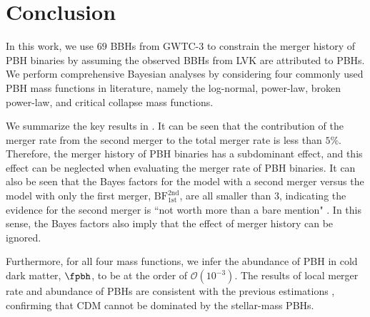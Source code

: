 \documentclass[
reprint,           %
superscriptaddress,%
amsmath,           %
amssymb,           %
aps,               %
prd,               %
notitlepage,       %
longbibliography,  %
floatfix,          %
nofootinbib,
]{revtex4-1}
\begin{document}
\section{\label{conclusion}Conclusion}

In this work, we use $69$ BBHs from GWTC-3 to constrain the merger history of PBH binaries by assuming the observed BBHs from LVK are attributed to PBHs. We perform comprehensive Bayesian analyses by considering four commonly used PBH mass functions in literature, namely the log-normal, power-law, broken power-law, and critical collapse mass functions. 

We summarize the key results in . 
It can be seen that the contribution of the merger rate from the second merger to the total merger rate is less than $5\%$.
Therefore, the merger history of PBH binaries has a subdominant effect, and this effect can be neglected when evaluating the merger rate of PBH binaries.
It can also be seen that the Bayes factors for the model with a second merger versus the model with only the first merger, $\mathrm{BF}^{\mathrm{2nd}}_{\mathrm{1st}}$, are all smaller than $3$, indicating the evidence for the second merger is ``not worth more than a bare mention" \cite{BF}. In this sense, the Bayes factors also imply that the effect of merger history can be ignored.

Furthermore, for all four mass functions, we infer the abundance of PBH in cold dark matter, $\fpbh$, to be at the order of $\mathcal{O}(10^{-3})$. The results of local merger rate and abundance of PBHs are consistent with the previous estimations \cite{Sasaki:2016jop,Ali-Haimoud:2017rtz,Chen:2018czv,Chen:2018rzo,Chen:2019irf,Wu:2020drm,Chen:2021nxo,Chen:2022fda}, confirming that CDM cannot be dominated by the stellar-mass PBHs. 
\end{document}
